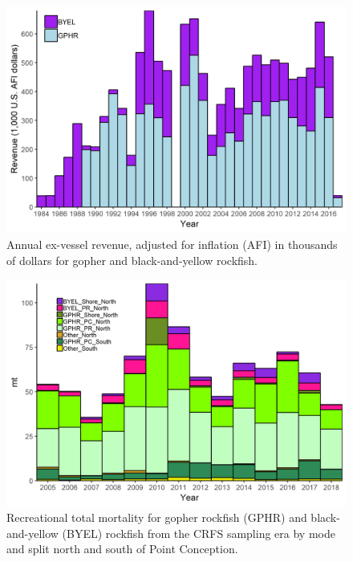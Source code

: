\documentclass[12pt,]{article}
\begin{document}
\begin{figure}
\centering
\includegraphics{Figures/GBY_revenue.png}
\caption{Annual ex-vessel revenue, adjusted for inflation (AFI) in
thousands of dollars for gopher and black-and-yellow rockfish.
\label{fig:GBY_revenue}}
\end{figure}

\begin{figure}
\centering
\includegraphics{Figures/CRFS_totalmort_gby.png}
\caption{Recreational total mortality for gopher rockfish (GPHR) and
black-and-yellow (BYEL) rockfish from the CRFS sampling era by mode and
split north and south of Point Conception. \label{fig:CFRS_catches}}
\end{figure}
\end{document}
